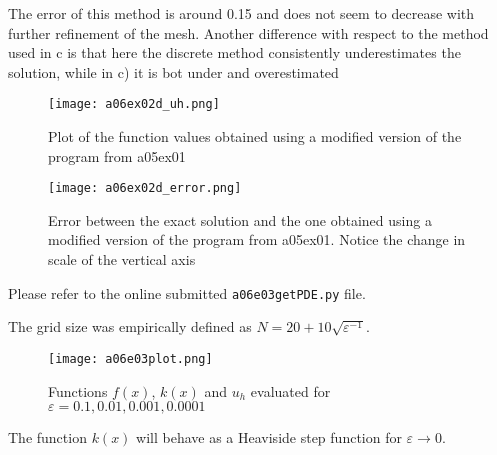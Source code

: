 %
%
%
The error of this method is around 0.15 and does not seem to decrease with further refinement of the mesh. Another difference with respect to the method used in c is that here the discrete method consistently underestimates the solution, while in c) it is bot under and overestimated 
%
\begin{figure}[H]
	\centering
	\texttt{[image: a06ex02d\_uh.png]} 
	\caption{Plot of the function values obtained using a modified version of the program from a05ex01}
	\label{fig:a05ex02b}
\end{figure}
%
\begin{figure}[H]
	\centering
	\texttt{[image: a06ex02d\_error.png]} 
	\caption{Error between the exact solution and the one obtained using a modified version of the program from a05ex01. Notice the change in scale of the vertical axis}
	\label{fig:a05ex02b}
\end{figure}
%

Please refer to the online submitted \texttt{a06e03getPDE.py} file.


The grid size was empirically defined as $N = 20 + 10\sqrt{\varepsilon^{-1}}$.

\begin{figure}[H]
	\centering
	\texttt{[image: a06e03plot.png]}
	\caption{Functions $f(x)$, $k(x)$ and $u_h$ evaluated for $\varepsilon = 0.1, 0.01, 0.001, 0.0001$}
	\label{fig:a06e03plot}
\end{figure}
%
\vspace*{-\FigUpperVSpace}
The function $k(x)$ will behave as a Heaviside step function for $\varepsilon \to 0$.